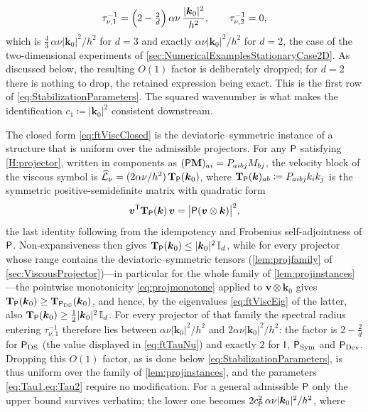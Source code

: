 \begin{equation}\label{eq:ftTauNu}
  \tau_{\nu,1}^{-1} = \Bigl(2-\tfrac{2}{d}\Bigr)\,\alpha\nu\,\frac{|\boldsymbol{k}_0|^2}{h^2},\qquad \tau_{\nu,2}^{-1}=0,
\end{equation}
which is $\tfrac43\,\alpha\nu|\boldsymbol{k}_0|^2/h^2$ for $d=3$ and exactly $\alpha\nu|\boldsymbol{k}_0|^2/h^2$ for $d=2$, the case of the two-dimensional experiments of \cref{sec:NumericalExamplesStationaryCase2D}. As discussed below, the resulting $O(1)$ factor is deliberately dropped; for $d=2$ there is nothing to drop, the retained expression being exact.
This is the first row of \cref{eq:StabilizationParameters}. The squared wavenumber is what makes the identification $c_1\coloneqq|\boldsymbol{k}_0|^2$ consistent downstream.

\begin{remark}\label{rem:ftGenericPi}
The closed form \cref{eq:ftViscClosed} is the deviatoric--symmetric instance of a structure that is uniform over the admissible projectors. For any $\mathsf{P}$ satisfying \cref{H:projector}, written in components as $(\mathsf{P}\mathbf{M})_{ai}=P_{aibj}M_{bj}$, the velocity block of the viscous symbol is $\widehat{\mathcal{L}}_{\nu}=(2\alpha\nu/h^2)\,\mathbf{T}_{\mathsf{P}}(\boldsymbol{k}_0)$, where $\mathbf{T}_{\mathsf{P}}(\boldsymbol{k})_{ab}\coloneqq P_{aibj}k_ik_j$ is the symmetric positive-semidefinite matrix with quadratic form
\begin{equation}\label{eq:ftGenericQuad}
  \boldsymbol{v}^{\mathsf T}\mathbf{T}_{\mathsf{P}}(\boldsymbol{k})\,\boldsymbol{v}
  = \bigl|\mathsf{P}(\boldsymbol{v}\otimes\boldsymbol{k})\bigr|^2 ,
\end{equation}
the last identity following from the idempotency and Frobenius self-adjointness of $\mathsf{P}$. Non-expansiveness then gives $\mathbf{T}_{\mathsf{P}}(\boldsymbol{k}_0)\le|\boldsymbol{k}_0|^2\,\mathbb{I}_d$, while for every projector whose range contains the deviatoric--symmetric tensors (\cref{lem:projfamily} of \cref{sec:ViscousProjector})---in particular for the whole family of \cref{lem:projinstances}---the pointwise monotonicity \cref{eq:projmonotone} applied to $\boldsymbol{v}\otimes\boldsymbol{k}_0$ gives $\mathbf{T}_{\mathsf{P}}(\boldsymbol{k}_0)\ge\mathbf{T}_{\mathsf{P}_{\mathrm{DS}}}(\boldsymbol{k}_0)$, and hence, by the eigenvalues \cref{eq:ftViscEig} of the latter, also $\mathbf{T}_{\mathsf{P}}(\boldsymbol{k}_0)\ge\tfrac12|\boldsymbol{k}_0|^2\,\mathbb{I}_d$. For every projector of that family the spectral radius entering $\tau_{\nu,1}^{-1}$ therefore lies between $\alpha\nu|\boldsymbol{k}_0|^2/h^2$ and $2\alpha\nu|\boldsymbol{k}_0|^2/h^2$: the factor is $2-\tfrac2d$ for $\mathsf{P}_{\mathrm{DS}}$ (the value displayed in \cref{eq:ftTauNu}) and exactly $2$ for $\mathsf{I}$, $\mathsf{P}_{\mathrm{Sym}}$ and $\mathsf{P}_{\mathrm{Dev}}$. Dropping this $O(1)$ factor, as is done below \cref{eq:StabilizationParameters}, is thus uniform over the family of \cref{lem:projinstances}, and the parameters \cref{eq:Tau1,eq:Tau2} require no modification. For a general admissible $\mathsf{P}$ only the upper bound survives verbatim; the lower one becomes $2c_{\mathsf{P}}^2\,\alpha\nu|\boldsymbol{k}_0|^2/h^2$, where

\end{remark}
